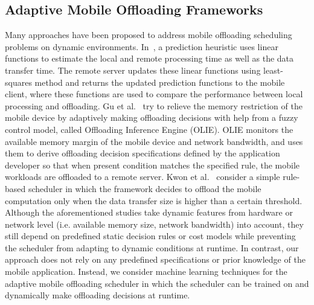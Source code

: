 \documentclass[10pt, conference, compsocconf]{IEEEtran}
\begin{document}
\subsection{Adaptive Mobile Offloading Frameworks}
%
Many approaches have been proposed to address mobile offloading
scheduling problems on dynamic environments.
%
In~\cite{shigeru}, a prediction heuristic uses linear functions to
estimate the local and remote processing time as well as the data
transfer time.
%
The remote server updates these linear functions using least-squares
method and returns the updated prediction functions to the mobile client,
where these functions are used to compare the performance between local
processing and offloading.
%
Gu et al.~\cite{xiaohui} try to relieve the memory restriction of the
mobile device by adaptively making offloading decisions with help from
a fuzzy control model, called Offloading Inference Engine (OLIE).
%
OLIE monitors the available memory margin of the mobile device and
network bandwidth, and uses them to derive offloading decision
specifications defined by the application developer so that when
present condition matches the specified rule, the mobile workloads are
offloaded to a remote server.
%
Kwon et al.~\cite{kwon} consider a simple rule-based
scheduler in which the framework decides to offload the mobile
computation only when the data transfer size is higher than a certain
threshold.\\
%
\indent Although the aforementioned studies take dynamic features
from hardware or network level (i.e. available memory size, network
bandwidth) into account, they still depend on predefined static
decision rules or cost models while preventing the scheduler from
adapting to dynamic conditions at runtime.
%
In contrast, our approach does not rely on any predefined specifications
or prior knowledge of the mobile application.
%
Instead, we consider machine learning techniques for the adaptive mobile
offloading scheduler in which the scheduler can be trained on and 
dynamically make offloading decisions at runtime. 
%
\end{document}
